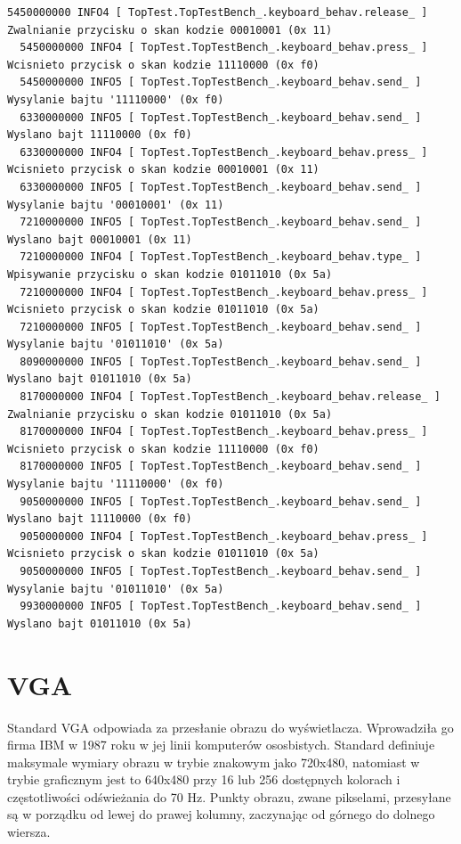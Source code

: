 \documentclass[a4paper,12pt]{article}
\begin{document}
\begin{lstlisting}[label=Keyboard_output,caption=Keyboard logs output]
  5450000000 INFO4 [ TopTest.TopTestBench_.keyboard_behav.release_ ]  Zwalnianie przycisku o skan kodzie 00010001 (0x 11)
  5450000000 INFO4 [ TopTest.TopTestBench_.keyboard_behav.press_ ]  Wcisnieto przycisk o skan kodzie 11110000 (0x f0)
  5450000000 INFO5 [ TopTest.TopTestBench_.keyboard_behav.send_ ]  Wysylanie bajtu '11110000' (0x f0)
  6330000000 INFO5 [ TopTest.TopTestBench_.keyboard_behav.send_ ]  Wyslano bajt 11110000 (0x f0)
  6330000000 INFO4 [ TopTest.TopTestBench_.keyboard_behav.press_ ]  Wcisnieto przycisk o skan kodzie 00010001 (0x 11)
  6330000000 INFO5 [ TopTest.TopTestBench_.keyboard_behav.send_ ]  Wysylanie bajtu '00010001' (0x 11)
  7210000000 INFO5 [ TopTest.TopTestBench_.keyboard_behav.send_ ]  Wyslano bajt 00010001 (0x 11)
  7210000000 INFO4 [ TopTest.TopTestBench_.keyboard_behav.type_ ]  Wpisywanie przycisku o skan kodzie 01011010 (0x 5a)
  7210000000 INFO4 [ TopTest.TopTestBench_.keyboard_behav.press_ ]  Wcisnieto przycisk o skan kodzie 01011010 (0x 5a)
  7210000000 INFO5 [ TopTest.TopTestBench_.keyboard_behav.send_ ]  Wysylanie bajtu '01011010' (0x 5a)
  8090000000 INFO5 [ TopTest.TopTestBench_.keyboard_behav.send_ ]  Wyslano bajt 01011010 (0x 5a)
  8170000000 INFO4 [ TopTest.TopTestBench_.keyboard_behav.release_ ]  Zwalnianie przycisku o skan kodzie 01011010 (0x 5a)
  8170000000 INFO4 [ TopTest.TopTestBench_.keyboard_behav.press_ ]  Wcisnieto przycisk o skan kodzie 11110000 (0x f0)
  8170000000 INFO5 [ TopTest.TopTestBench_.keyboard_behav.send_ ]  Wysylanie bajtu '11110000' (0x f0)
  9050000000 INFO5 [ TopTest.TopTestBench_.keyboard_behav.send_ ]  Wyslano bajt 11110000 (0x f0)
  9050000000 INFO4 [ TopTest.TopTestBench_.keyboard_behav.press_ ]  Wcisnieto przycisk o skan kodzie 01011010 (0x 5a)
  9050000000 INFO5 [ TopTest.TopTestBench_.keyboard_behav.send_ ]  Wysylanie bajtu '01011010' (0x 5a)
  9930000000 INFO5 [ TopTest.TopTestBench_.keyboard_behav.send_ ]  Wyslano bajt 01011010 (0x 5a)
\end{lstlisting}


\newpage
\section{VGA}
Standard VGA odpowiada za przesłanie obrazu do wyświetlacza. Wprowadziła go firma IBM w 1987 roku w jej linii komputerów ososbistych. Standard definiuje maksymale wymiary obrazu w trybie znakowym jako 720x480, natomiast w trybie  graficznym jest to 640x480 przy 16 lub 256 dostępnych kolorach i częstotliwości odświeżania do 70 Hz. Punkty obrazu, zwane pikselami, przesyłane są w porządku od lewej do prawej kolumny, zaczynając od górnego do dolnego wiersza.
\end{document}
